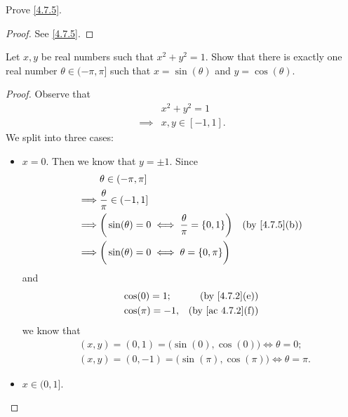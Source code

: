 \begin{exercise}\label{ex 4.7.3}
  Prove \cref{4.7.5}.
\end{exercise}

\begin{proof}
  See \cref{4.7.5}.
\end{proof}

\begin{exercise}\label{ex 4.7.4}
  Let \(x, y\) be real numbers such that \(x^2 + y^2 = 1\).
  Show that there is exactly one real number \(\theta \in (-\pi, \pi]\) such that \(x = \sin(\theta)\) and \(y = \cos(\theta)\).
\end{exercise}

\begin{proof}
  Observe that
  \begin{align*}
             & x^2 + y^2 = 1     \\
    \implies & x, y \in [-1, 1].
  \end{align*}
  We split into three cases:
  \begin{itemize}
    \item \(x = 0\).
          Then we know that \(y = \pm 1\).
          Since
          \begin{align*}
                     & \theta \in (-\pi, \pi]                                                                        \\
            \implies & \frac{\theta}{\pi} \in (-1, 1]                                                                \\
            \implies & \bigg(\sin(\theta) = 0 \iff \frac{\theta}{\pi} = \{0, 1\}\bigg) & \text{(by \cref{4.7.5}(b))} \\
            \implies & \bigg(\sin(\theta) = 0 \iff \theta = \{0, \pi\}\bigg)
          \end{align*}
          and
          \begin{align*}
             & \cos(0) = 1;    & \text{(by \cref{4.7.2}(e))}    \\
             & \cos(\pi) = -1, & \text{(by \cref{ac 4.7.2}(f))}
          \end{align*}
          we know that
          \begin{align*}
             & (x, y) = (0, 1) = \big(\sin(0), \cos(0)\big) \iff \theta = 0;        \\
             & (x, y) = (0, -1) = \big(\sin(\pi), \cos(\pi)\big) \iff \theta = \pi.
          \end{align*}
    \item \(x \in (0, 1]\).

\end{itemize}
\end{proof}

